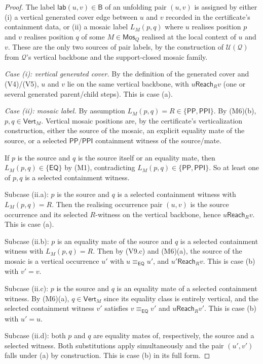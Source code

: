 \documentclass[11pt]{article}
\newcommand{\Base}{\mathsf{B}}
\newcommand{\EQ}{\mathsf{EQ}}
\newcommand{\PP}{\mathsf{PP}}
\newcommand{\PPI}{\mathsf{PPI}}
\newcommand{\Q}{\mathcal Q}
\newcommand{\U}{\mathcal U}
\newcommand{\Mos}{\mathsf{Mos}}
\newcommand{\Reach}{\mathrel{\mathsf{Reach}}}
\newcommand{\eqc}{\equiv_{\EQ}}
\newcommand{\lab}{\mathsf{lab}}
\newcommand{\Vrt}{\mathsf{Vert}}
\begin{document}
\begin{proof}
The label $\lab(u,v)\in\Base$ of an unfolding pair $(u,v)$ is
assigned by either (i) a vertical generated cover edge between $u$
and $v$ recorded in the certificate's containment data, or (ii) a
mosaic label $L_M(p,q)$ where $u$ realises position $p$ and $v$
realises position $q$ of some $M\in\Mos_Q$ realised at the local
context of $u$ and $v$.  These are the only two sources of pair
labels, by the construction of $\U(\Q)$ from $\Q$'s vertical
backbone and the support-closed mosaic family.

\emph{Case (i): vertical generated cover.}  By the definition of the
generated cover and (V4)/(V5), $u$ and $v$ lie on the same vertical
backbone, with $u\Reach_R v$ (one or several generated parent/child
steps).  This is case (a).

\emph{Case (ii): mosaic label.}  By assumption $L_M(p,q)=R\in
\{\PP,\PPI\}$.  By (M6)(b), $p,q\in\Vrt_M$.  Vertical mosaic
positions are, by the certificate's verticalization construction,
either the source of the mosaic, an explicit equality mate of the
source, or a selected $\PP/\PPI$ containment witness of the
source/mate.

If $p$ is the source and $q$ is the source itself or an
equality mate, then $L_M(p,q)\in\{\EQ\}$ by (M1), contradicting
$L_M(p,q)\in\{\PP,\PPI\}$.  So at least one of $p,q$ is a selected
containment witness.

Subcase (ii.a): $p$ is the source and $q$ is a selected
containment witness with $L_M(p,q)=R$.  Then the realising
occurrence pair $(u,v)$ is the source occurrence and its
selected $R$-witness on the vertical backbone, hence $u\Reach_R v$.
This is case (a).

Subcase (ii.b): $p$ is an equality mate of the source and $q$ is a
selected containment witness with $L_M(p,q)=R$.  Then by (V9.c) and
(M6)(a), the source of the mosaic is a vertical occurrence $u'$
with $u\eqc u'$, and $u'\Reach_R v$.  This is case (b) with
$v'=v$.

Subcase (ii.c): $p$ is the source and $q$ is an equality mate of a
selected containment witness.  By (M6)(a), $q\in\Vrt_M$ since its
equality class is entirely vertical, and the selected containment
witness $v'$ satisfies $v\eqc v'$ and $u\Reach_R v'$.  This is case
(b) with $u'=u$.

Subcase (ii.d): both $p$ and $q$ are equality mates of, respectively,
the source and a selected witness.  Both substitutions apply
simultaneously and the pair $(u',v')$ falls under (a) by
construction.  This is case (b) in its full form.


\end{proof}
\end{document}
